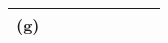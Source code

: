 \begin{table}[]
\begin{tabular}{|c|l|l|l|l|l|l|l|l|l|}
(g)                             &                                                 &                                         &                                         &                                         & \cellcolor[HTML]{C0C0C0}               & \cellcolor[HTML]{C0C0C0}                & \multicolumn{3}{l|}{\multirow{-9}{*}{}}                                                                                  \\ \hline
\end{tabular}
\end{table}